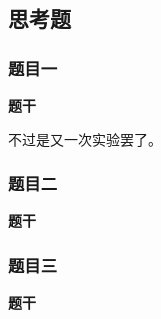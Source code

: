 
\subsection{思考题}
\subsubsection{题目一}
{\sourcehan\textbf{题干}}
\par
不过是又一次实验罢了。

\subsubsection{题目二}
{\sourcehan\textbf{题干}}
\par

\subsubsection{题目三}
{\sourcehan\textbf{题干}}
\par